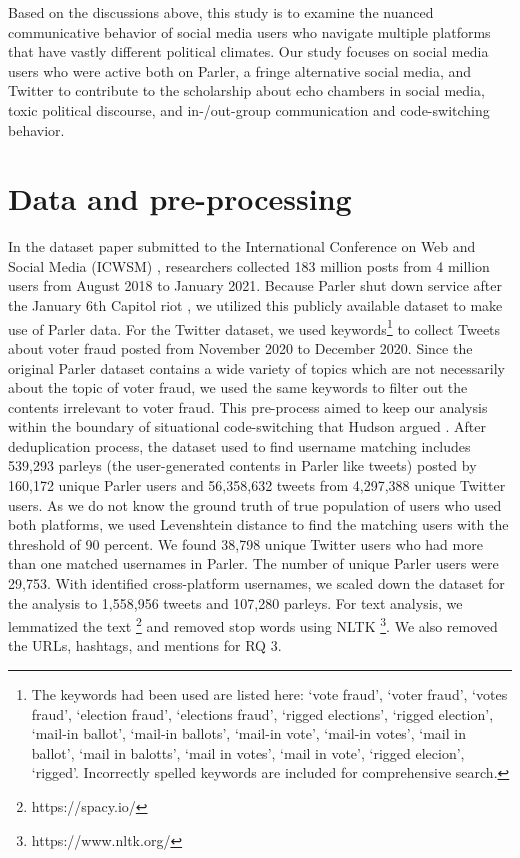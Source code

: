 \documentclass[Crown,sagev,times]{sagej}
\begin{document}
Based on the discussions above, this study is to examine the nuanced communicative behavior of social media users who navigate multiple platforms that have vastly different political climates. Our study focuses on social media users who were active both on Parler, a fringe alternative social media, and Twitter to contribute to the scholarship about echo chambers in social media, toxic political discourse, and in-/out-group communication and code-switching behavior. 
 
\section{Data and pre-processing} \label{sec:data}
 In the dataset paper submitted to the International Conference on Web and Social Media (ICWSM) \cite{aliapoulios2021large}, researchers collected 183 million posts from 4 million users from August 2018 to January 2021. Because Parler shut down service after the January 6th Capitol riot  \cite{m2021political}, we utilized this publicly available dataset to make use of Parler data. 
 For the Twitter dataset, we used keywords\footnote[1]
 {The keywords had been used are listed here: `vote fraud', `voter fraud', `votes fraud', `election fraud', 
 `elections fraud', `rigged elections', `rigged election', `mail-in ballot', `mail-in ballots', `mail-in vote', 
 `mail-in votes', `mail in ballot', `mail in balotts', `mail in votes', `mail in vote', `rigged elecion', `rigged'.
 Incorrectly spelled keywords are included for comprehensive search.\label{footnote1}} to collect Tweets about voter fraud posted from November 2020 to December 2020. 
 Since the original Parler dataset contains a wide variety of topics which are not necessarily about the topic of voter fraud, we used the same keywords to filter out the contents irrelevant to voter fraud. 
 This pre-process aimed to keep our analysis within the boundary of situational code-switching that Hudson argued \cite{hudson_1996}. 
 After deduplication process, the dataset used to find username matching includes 
 539,293 parleys (the user-generated contents in Parler like tweets) posted by 
 160,172 unique Parler users and 56,358,632 tweets from 4,297,388 unique Twitter users.
 As we do not know the ground truth of true population of users who used both platforms,
 we used Levenshtein distance \cite{levenshtein1966binary} to find the matching users with the threshold of 90 percent. We found 38,798 unique Twitter users who had more than one matched
 usernames in Parler. The number of unique Parler users were 29,753. 
 With identified cross-platform usernames, we scaled down the dataset for the analysis to
 1,558,956 tweets and 107,280 parleys. For text analysis, we lemmatized the text \footnote[2]{https://spacy.io/} 
 and removed stop words using NLTK \footnote[3]{https://www.nltk.org/}. 
 We also removed the URLs, hashtags, and mentions for RQ 3.
\end{document}
